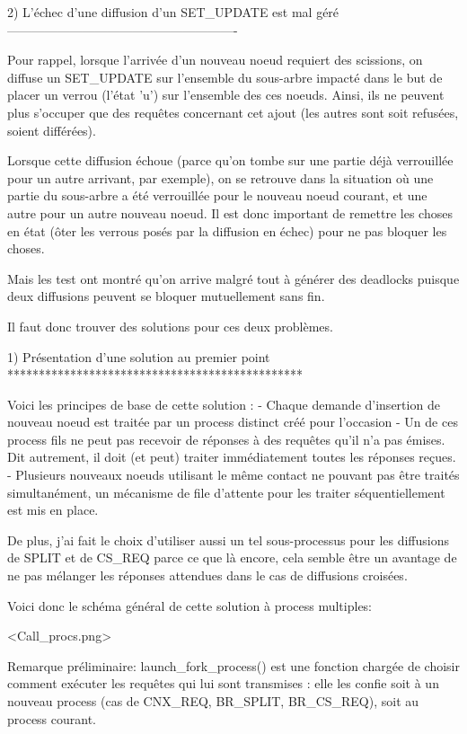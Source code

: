 2) L'échec d'une diffusion d'un SET_UPDATE est mal géré
-------------------------------------------------------

Pour rappel, lorsque l'arrivée d'un nouveau noeud requiert des scissions, on diffuse un SET_UPDATE
sur l'ensemble du sous-arbre impacté dans le but de placer un verrou (l'état 'u') sur l'ensemble des
ces noeuds. Ainsi, ils ne peuvent plus s'occuper que des requêtes concernant cet ajout (les autres
sont soit refusées, soient différées).

Lorsque cette diffusion échoue (parce qu'on tombe sur une partie déjà verrouillée pour un autre
arrivant, par exemple), on se retrouve dans la situation où une partie du sous-arbre a été
verrouillée pour le nouveau noeud courant, et une autre pour un autre nouveau noeud. Il est donc
important de remettre les choses en état (ôter les verrous posés par la diffusion en échec) pour ne
pas bloquer les choses.

Mais les test ont montré qu'on arrive malgré tout à générer des deadlocks puisque deux diffusions
peuvent se bloquer mutuellement sans fin.

Il faut donc trouver des solutions pour ces deux problèmes.

1) Présentation d'une solution au premier point
***********************************************

Voici les principes de base de cette solution :
  - Chaque demande d'insertion de nouveau noeud est traitée par un process distinct créé pour
    l'occasion
  - Un de ces process fils ne peut pas recevoir de réponses à des requêtes qu'il n'a pas émises.
    Dit autrement, il doit (et peut) traiter immédiatement toutes les réponses reçues.
  - Plusieurs nouveaux noeuds utilisant le même contact ne pouvant pas être traités simultanément,
    un mécanisme de file d'attente pour les traiter séquentiellement est mis en place.

De plus, j'ai fait le choix d'utiliser aussi un tel sous-processus pour les diffusions de SPLIT et
de CS_REQ parce ce que là encore, cela semble être un avantage de ne pas mélanger les réponses
attendues dans le cas de diffusions croisées.

Voici donc le schéma général de cette solution à process multiples:

<Call_procs.png>

Remarque préliminaire:
launch_fork_process() est une fonction chargée de choisir comment exécuter les requêtes qui lui
sont transmises : elle les confie soit à un nouveau process (cas de CNX_REQ, BR_SPLIT, BR_CS_REQ),
soit au process courant.

